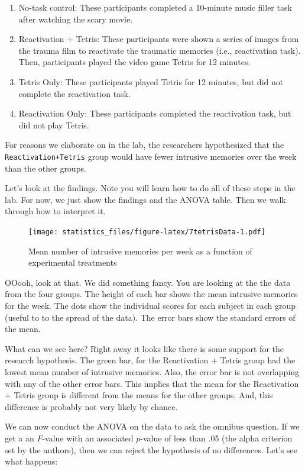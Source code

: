 \documentclass[]{book}
\providecommand{\tightlist}{%
  \setlength{\itemsep}{0pt}\setlength{\parskip}{0pt}}
\begin{document}
\begin{enumerate}
\def\labelenumi{\arabic{enumi}.}
\tightlist
\item
  No-task control: These participants completed a 10-minute music filler task after watching the scary movie.
\item
  Reactivation + Tetris: These participants were shown a series of images from the trauma film to reactivate the traumatic memories (i.e., reactivation task). Then, participants played the video game Tetris for 12 minutes.
\item
  Tetris Only: These participants played Tetris for 12 minutes, but did not complete the reactivation task.
\item
  Reactivation Only: These participants completed the reactivation task, but did not play Tetris.
\end{enumerate}

For reasons we elaborate on in the lab, the researchers hypothesized that the \texttt{Reactivation+Tetris} group would have fewer intrusive memories over the week than the other groups.

Let's look at the findings. Note you will learn how to do all of these steps in the lab. For now, we just show the findings and the ANOVA table. Then we walk through how to interpret it.

\begin{figure}
\centering
\texttt{[image: statistics\_files/figure-latex/7tetrisData-1.pdf]}
\caption{\label{fig:7tetrisData}Mean number of intrusive memories per week as a function of experimental treatments}
\end{figure}

OOooh, look at that. We did something fancy. You are looking at the the data from the four groups. The height of each bar shows the mean intrusive memories for the week. The dots show the individual scores for each subject in each group (useful to to the spread of the data). The error bars show the standard errors of the mean.

What can we see here? Right away it looks like there is some support for the research hypothesis. The green bar, for the Reactivation + Tetris group had the lowest mean number of intrusive memories. Also, the error bar is not overlapping with any of the other error bars. This implies that the mean for the Reactivation + Tetris group is different from the means for the other groups. And, this difference is probably not very likely by chance.

We can now conduct the ANOVA on the data to ask the omnibus question. If we get a an \(F\)-value with an associated \(p\)-value of less than .05 (the alpha criterion set by the authors), then we can reject the hypothesis of no differences. Let's see what happens:
\end{document}
